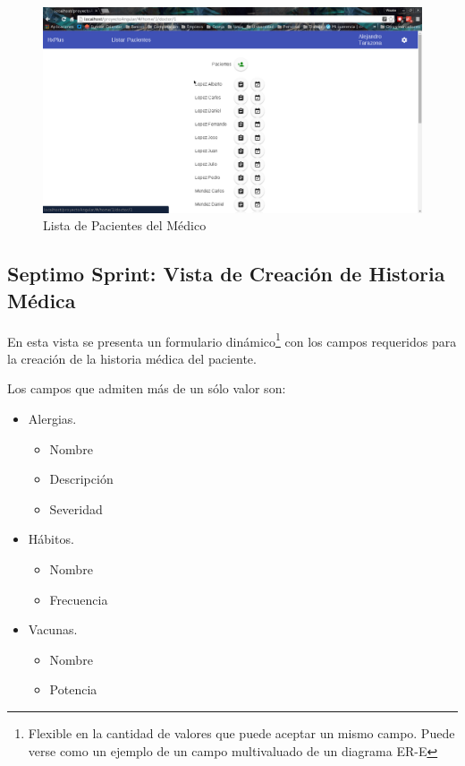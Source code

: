     \begin{figure}[htbp!]
        \begin{center}
            \includegraphics[width=.9\textwidth]{figures/p6}
        \end{center}
        \caption{\label{Pacientes}Lista de Pacientes del Médico}
    \end{figure}
    
    \subsection{Septimo Sprint: Vista de Creación de Historia Médica}
    
    En esta vista se presenta un formulario dinámico\footnote{Flexible en la cantidad de valores que puede aceptar un mismo campo. Puede verse como un ejemplo de un campo multivaluado de un diagrama ER-E} con los campos requeridos para la creación de la historia médica del paciente.
    
    Los campos que admiten más de un sólo valor son:
    \begin{itemize}
        \item Alergias.
            \begin{itemize}
                \item Nombre
                \item Descripción
                \item Severidad
            \end{itemize}
        \item Hábitos.
            \begin{itemize}
                \item Nombre
                \item Frecuencia
            \end{itemize}
        \item Vacunas.
            \begin{itemize}
                \item Nombre
                \item Potencia
            \end{itemize}
    \end{itemize}
    
